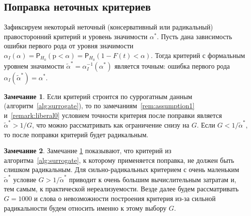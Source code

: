 \documentclass[specialist,
substylefile = spbu_report.rtx,
subf,href,colorlinks=true, 12pt]{disser}
\theoremstyle{definition}
\newtheorem{algorithm}{Алгоритм}
\newtheorem{remark}{Замечание}
\newtheorem{assumption}{Предположение}
\begin{document}
\subsection{Поправка неточных критериев}\label{sect:correction}
Зафиксируем некоторый неточный (консервативный или радикальный) правосторонний критерий и уровень значимости $\alpha^*$. Пусть дана зависимость ошибки первого рода от уровня значимости $\alpha_I(\alpha)=\mathsf P_{H_0}(\mathrm p < \alpha)=\mathsf P_{H_0}(1 - F(t) < \alpha)$. Тогда критерий с формальным уровнем значимости $\widetilde\alpha^*=\alpha_I^{-1}(\alpha^*)$ является точным: ошибка первого рода $\alpha_I(\widetilde\alpha^*)=\alpha^*$.
\begin{remark}
\label{remark:liberal1}
	Если критерий строится по суррогатным данным (алгоритм~\ref{alg:surrogate}), то по замечаниям~\ref{rem:assumption1} и~\ref{remark:liberal0} условием точности критерия после поправки является $\widetilde\alpha^* > 1/G$, что можно рассматривать как ограничение снизу на $G$. Если $G < 1/\widetilde\alpha^*$, то после поправки критерий будет радикальным.
\end{remark}

\begin{remark}\label{remark:liberal}
Замечание \ref{remark:liberal1} показывают, что критерий из алгоритма~\ref{alg:surrogate}, к которому применяется поправка, не должен быть слишком радикальным. Для сильно-радикальных критерием с очень маленьким $\widetilde\alpha^*$ условие $G > 1/\widetilde\alpha^*$ приводит к очень большим вычислительным затратам и, тем самым, к практической нереализуемости. Везде далее будем рассматривать $G=1000$ и слова о невозможности построения критерия из-за сильной радикальности будем относить именно к этому выбору $G$.
\end{remark}
\end{document}

